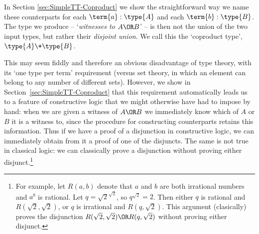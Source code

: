 In Section \ref{sec:SimpleTT-Coproduct} we show the straightforward way we name these counterparts for each $\term{a}:\type{A}$ and each $\term{b}:\type{B}$.
The type we produce -- `\emph{witnesses to $A \OR B$}' --
is then not the union of the two input types, but rather their \emph{disjoint union}.  %
We call this the `coproduct type', $\type{A} \+ \type{B}$.

This may seem fiddly and therefore an obvious disadvantage of type theory, with its `one type per term' requirement (versus set theory, in which an element can belong to any number of different sets).  However, we show in Section~\ref{sec:SimpleTT-Coproduct} that this requirement automatically leads us to a feature of constructive logic that we might otherwise have had to impose by hand: when we are given a witness of $A \OR B$ we immediately know which of $A$ or $B$ it is a witness to, since the procedure for constructing counterparts retains this information.  
Thus if we have a proof of a disjunction in constructive logic, we can immediately obtain from it a proof of one of the disjuncts.  The same is not true in classical logic: we can classically prove a disjunction without proving either disjunct.\footnote{
For example, let $R(a,b)$ denote that $a$ and $b$ are both irrational numbers and $a^b$ is rational.  Let $q=\sqrt{2}^{\sqrt{2}}$, so $q^{\sqrt{2}} = 2$.  Then either $q$ is rational and $R(\sqrt{2},\sqrt{2})$, or $q$ is irrational and $R(q, \sqrt{2})$.  This argument (clasically) proves the disjunction 
$R(\sqrt{2},\sqrt{2}) \OR R(q, \sqrt{2})$ without proving either disjunct.
}






